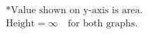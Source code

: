 \documentclass[preview]{standalone}
\begin{document}
\begin{align*}
* \textrm{Value shown on y-axis is area.} \\ \textrm{Height}=\infty \quad \textrm{for both graphs.}
\end{align*}
\end{document}
